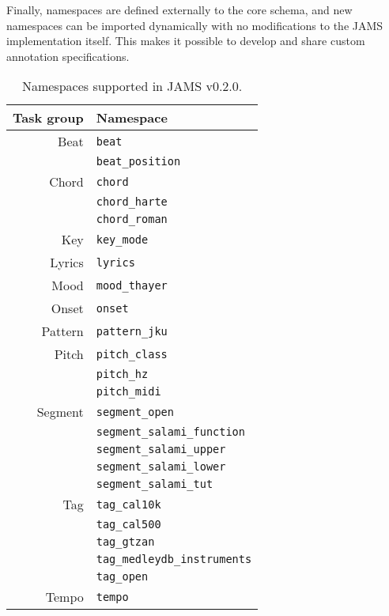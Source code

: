 \documentclass{article}
\begin{document}
Finally, namespaces are defined externally to the core schema, and new namespaces can be imported dynamically with no modifications to the JAMS implementation itself.
This makes it possible to develop and share custom annotation specifications.

\begin{table}
    \caption{Namespaces supported in JAMS v0.2.0.}\label{tab:namespaces}
    \centering
    \begin{tabular}{rl}
    \toprule
    Task group                  & Namespace\\
    \midrule
    Beat       & \texttt{beat}\\
                                & \texttt{beat\_position}\\

    Chord      & \texttt{chord}\\
                                & \texttt{chord\_harte}\\
                                & \texttt{chord\_roman}\\
    Key                         & \texttt{key\_mode }\\
    Lyrics                      & \texttt{lyrics}\\
    Mood                        & \texttt{mood\_thayer}\\
    Onset                       & \texttt{onset}\\
    Pattern                     & \texttt{pattern\_jku}\\
    Pitch      & \texttt{pitch\_class}\\
                                & \texttt{pitch\_hz}\\
                                & \texttt{pitch\_midi}\\
    Segment    & \texttt{segment\_open}\\
                                & \texttt{segment\_salami\_function}\\
                                & \texttt{segment\_salami\_upper}\\
                                & \texttt{segment\_salami\_lower}\\
                                & \texttt{segment\_salami\_tut}\\
    Tag        & \texttt{tag\_cal10k}\\
                                & \texttt{tag\_cal500}\\
                                & \texttt{tag\_gtzan}\\
                                & \texttt{tag\_medleydb\_instruments}\\
                                & \texttt{tag\_open}\\
    Tempo                       & \texttt{tempo}\\
    \bottomrule
    \end{tabular}
\end{table}
\end{document}
